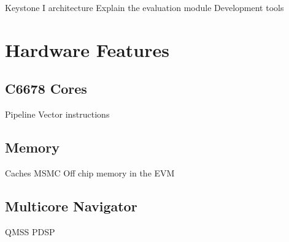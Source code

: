 Keystone I architecture
Explain the evaluation module
Development tools

\section{Hardware Features}
\subsection{C6678 Cores}
Pipeline
Vector instructions
\subsection{Memory}
Caches
MSMC
Off chip memory in the EVM
\subsection{Multicore Navigator}
QMSS
PDSP


